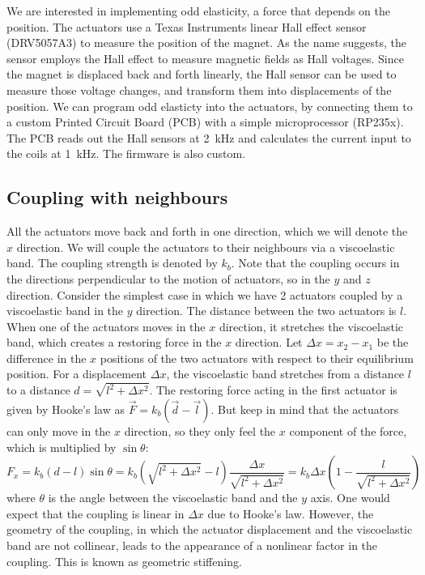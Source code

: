 \documentclass[11pt, a4paper]{article} %
\begin{document}
We are interested in implementing odd elasticity, a force that depends on the position. 
The actuators use a Texas Instruments linear Hall effect sensor (DRV5057A3) to measure the position of the magnet. 
As the name suggests, the sensor employs the Hall effect to measure magnetic fields as Hall voltages. 
Since the magnet is displaced back and forth linearly, the Hall sensor can be used to measure those voltage changes, 
and transform them into displacements of the position. 
We can program odd elasticty into the actuators, by connecting them to a custom Printed Circuit Board (PCB) 
with a simple microprocessor (RP235x). The PCB reads out the Hall sensors at \SI{2}{kHz} 
and calculates the current input to the coils at \SI{1}{kHz}. The firmware is also custom. 

\subsection{Coupling with neighbours}
\label{subsec:coupling}
All the actuators move back and forth in one direction, which we will denote the $x$ direction. 
We will couple the actuators to their neighbours via a viscoelastic band. The coupling strength 
is denoted by $k_b$. Note that the coupling occurs in the directions perpendicular to 
the motion of actuators, so in the $y$ and $z$ direction. Consider the simplest case in which we have 2 
actuators coupled by a viscoelastic band in the $y$ direction. 
The distance between the two actuators is $l$. When one of the actuators moves in the $x$ direction, 
it stretches the viscoelastic band, which creates a restoring force in the $x$ direction. Let 
$\varDelta x = x_2 - x_1$ be the difference in the $x$ positions of the two actuators with 
respect to their equilibrium position. For a displacement $\varDelta x$, the viscoelastic band stretches 
from a distance $l$ to a distance $d = \sqrt{l^2 + \varDelta x^2}$. The restoring force 
acting in the first actuator is given by Hooke's law as $\vec{F} = k_b (\vec{d} - \vec{l})$. 
But keep in mind that the actuators can only move in the $x$ direction, so they only feel 
the $x$ component of the force, which is multiplied by $\sin \theta$:
\begin{equation}
    F_x = k_b (d - l) \sin \theta = k_b (\sqrt{l^2 + \varDelta x^2} - l) \frac{\varDelta x}{\sqrt{l^2 + \varDelta x^2}} 
    = k_b \varDelta x \left(1 - \frac{l}{\sqrt{l^2 + \varDelta x^2}}\right) 
    \label{eq_geometric_stiffening}
\end{equation}
where $\theta$ is the angle between the viscoelastic band and the $y$ axis. One would expect that the coupling 
is linear in $\varDelta x$ due to Hooke's law. However, the geometry of the coupling, in which the 
actuator displacement and the viscoelastic band are not collinear, leads to the appearance of a 
nonlinear factor in the coupling. This is known as geometric stiffening. 
\end{document}
